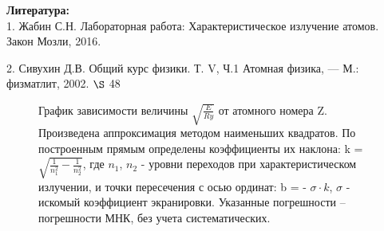 \documentclass[a4paper, 12pt]{article}%
\begin{document}
			
			\textbf{Литература: } \\
			
			1. Жабин С.Н. Лабораторная работа: Характеристическое излучение атомов. Закон Мозли, 2016.
			
			2. Сивухин Д.В. Общий курс физики. Т. V, Ч.1 Атомная
			физика, — М.: физматлит, 2002. $\S$ 48 
			
			\newpage
		
		
		\begin{figure}[H]
			\caption{График зависимости величины $\sqrt{\frac{E}{Ry}}$ от атомного номера Z. Произведена аппроксимация методом наименьших квадратов. По построенным прямым определены коэффициенты их наклона: k = $\sqrt{\frac{1}{n_1^2} - \frac{1}{n_2^2}}$, где $n_1$, $n_2$ - уровни переходов при характеристическом излучении, и точки пересечения с осью ординат: b = - $\sigma \cdot k$, $\sigma$ - искомый коэффициент экранировки. Указанные погрешности -- погрешности МНК, без учета систематических.}
		\end{figure}
		
		
		
		
		
		
		
		
		
		
		
		
		
		
		
		
		
		
	
	
	
	
	
	
	
	
	
	
	
	
	
	
	
	
\end{document}
